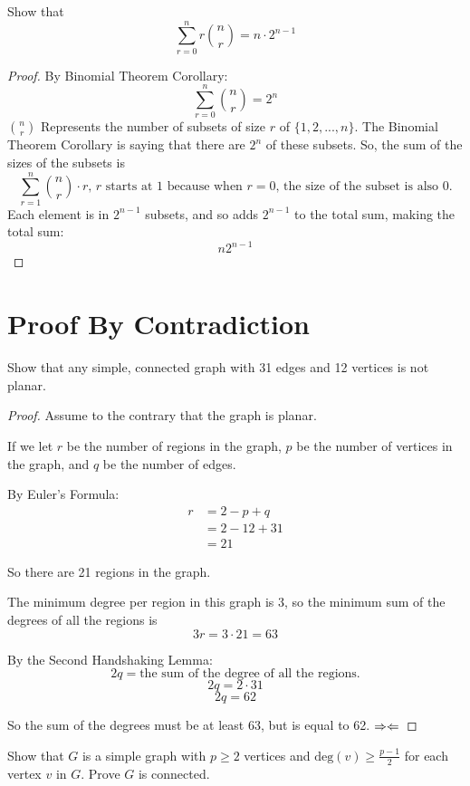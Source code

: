 \documentclass[12pt]{article}
\begin{document}
\newpage
Show that
$$\sum_{r=0}^n r \binom{n}{r} = n\cdot 2^{n-1}$$

\begin{proof}
By Binomial Theorem Corollary:
$$\sum_{r=0}^n \binom{n}{r}= 2^n$$
$\binom{n}{r}$ Represents the number of subsets of size $r$ of $\{ 1, 2, ..., n\}$. The Binomial Theorem Corollary is saying that there are $2^n$ of these subsets. So, the sum of the sizes of the subsets is
$$\sum_{r=1}^n\binom{n}{r}\cdot r\text{, }r\text{ starts at 1 because when }r=0\text{, the size of the subset is also 0.}$$
Each element is in $2^{n-1}$ subsets, and so adds $2^{n-1}$ to the total sum, making the total sum: 
$$n2^{n-1}$$
\end{proof}

\newpage
\section{Proof By Contradiction}

Show that any simple, connected graph with 31 edges and 12 vertices is not planar.

\begin{proof}
Assume to the contrary that the graph is planar.

If we let $r$ be the number of regions in the graph, $p$ be the number of vertices in the graph, and $q$ be the number of edges.

By Euler's Formula:
\begin{align*}
r &= 2 - p + q\\
&= 2 - 12 + 31\\
&= 21
\end{align*}

So there are 21 regions in the graph.

The minimum degree per region in this graph is 3, so the minimum sum of the degrees of all the regions is
$$3r = 3 \cdot 21 = 63$$

By the Second Handshaking Lemma:
$$2q = \text{the sum of the degree of all the regions.}$$
$$2q = 2 \cdot 31$$
$$2q = 62$$

So the sum of the degrees must be at least 63, but is equal to 62. $\Rightarrow\Leftarrow$

\end{proof}
\newpage
\begin{flushleft}
Show that $G$ is a simple graph with $p \geq 2$ vertices and $\text{deg}(v)\geq\frac{p - 1}{2}$ for each vertex $v$ in $G$. Prove $G$ is connected.
\end{flushleft}
\end{document}

